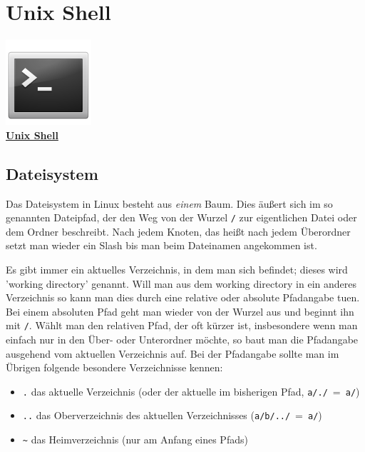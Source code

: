 \chapter{Unix Shell}
\begin{center}
    \includegraphics[width=120px]{img/term.pdf} \\
    \textbf{\href{http://en.wikipedia.org/wiki/Unix_shell}{Unix Shell}}
\end{center}

\section{Dateisystem}
Das Dateisystem in Linux besteht aus \emph{einem} Baum.
Dies äußert sich im so genannten Dateipfad, der den Weg von der Wurzel \texttt{/} zur eigentlichen Datei oder dem Ordner beschreibt.
Nach jedem Knoten, das heißt nach jedem Überordner setzt man wieder ein Slash bis man beim Dateinamen angekommen ist.

Es gibt immer ein aktuelles Verzeichnis, in dem man sich befindet; dieses wird 'working directory' genannt.
Will man aus dem working directory in ein anderes Verzeichnis so kann man dies durch eine relative oder absolute Pfadangabe tuen.
Bei einem absoluten Pfad geht man wieder von der Wurzel aus und beginnt ihn mit \texttt{/}.
Wählt man den relativen Pfad, der oft kürzer ist, insbesondere wenn man einfach nur in den Über- oder Unterordner möchte, so baut man die Pfadangabe ausgehend vom aktuellen Verzeichnis auf.
Bei der Pfadangabe sollte man im Übrigen folgende besondere Verzeichnisse kennen:
    \begin{itemize}
      \item \texttt{.} das aktuelle Verzeichnis (oder der aktuelle im bisherigen Pfad, \texttt{a/./}~=~\texttt{a/})
      \item \texttt{..} das Oberverzeichnis des aktuellen Verzeichnisses (\texttt{a/b/../}~=~\texttt{a/})
      \item \texttt{\textasciitilde} das Heimverzeichnis (nur am Anfang eines Pfads)
    \end{itemize}


